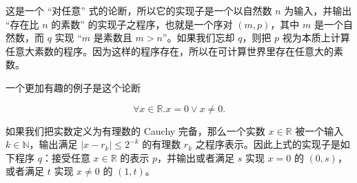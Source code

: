 \documentclass{ctexart}
\begin{document}
      这是一个 “对任意” 式的论断，所以它的实现子是一个以自然数 \(n\) 为输入，并输出 “存在比 \(n\) 的素数” 的实现子之程序，也就是一个序对 \((m, p)\)，其中 \(m\) 是一个自然数，而 \(q\) 实现 “\(m\) 是素数且 \(m > n\)”。如果我们忘却 \(q\)，则把 \(p\) 视为本质上计算任意大素数的程序。因为这样的程序存在，所以在可计算世界里存在任意大的素数。

      一个更加有趣的例子是这个论断

        \[\forall x \in \mathbb{R}. x = 0 \lor x \neq 0.\]

      如果我们把实数定义为有理数的 Cauchy 完备，那么一个实数 \(x \in \mathbb R \) 被一个输入 \(k \in \mathbb N\)，输出满足 \(\mid  x - r_k \mid \leq 2^{-k} \) 的有理数 \(r_k\) 之程序表示。因此上式的实现子是如下程序 \(q\)：接受任意 \(x\in\mathbb R\) 的表示 \(p\)，并输出或者满足 \(s\) 实现 \(x=0\) 的 \((0, s)\)，或者满足 \(t\) 实现 \(x\neq0\) 的 \((1, t)\)。 






      
\end{document}
